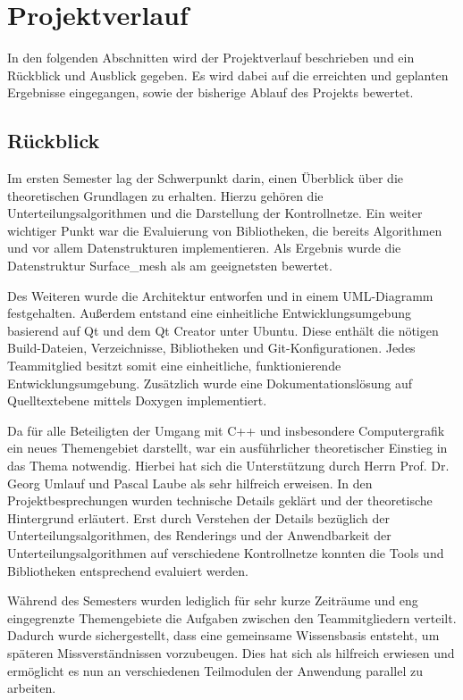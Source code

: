 \chapter{Projektverlauf}

In den folgenden Abschnitten wird der Projektverlauf beschrieben und ein Rückblick und Ausblick gegeben.
Es wird dabei auf die erreichten und geplanten Ergebnisse eingegangen, sowie der bisherige Ablauf des Projekts bewertet.

\section{Rückblick}

Im ersten Semester lag der Schwerpunkt darin, einen Überblick über die theoretischen Grundlagen zu erhalten. 
Hierzu gehören die Unterteilungsalgorithmen und die Darstellung der Kontrollnetze.
Ein weiter wichtiger Punkt war die Evaluierung von Bibliotheken, die bereits Algorithmen und vor allem Datenstrukturen implementieren. 
Als Ergebnis wurde die Datenstruktur Surface\_mesh als am geeignetsten bewertet.

Des Weiteren wurde die Architektur entworfen und in einem UML-Diagramm festgehalten.
Außerdem entstand eine einheitliche Entwicklungsumgebung basierend auf Qt und dem Qt Creator unter Ubuntu.
Diese enthält die nötigen Build-Dateien, Verzeichnisse, Bibliotheken und Git-Konfigurationen.
Jedes Teammitglied besitzt somit eine einheitliche, funktionierende Entwicklungsumgebung.
Zusätzlich wurde eine Dokumentationslösung auf Quelltextebene mittels Doxygen implementiert.

Da für alle Beteiligten der Umgang mit C++ und insbesondere Computergrafik ein neues Themengebiet darstellt, war ein ausführlicher theoretischer Einstieg in das Thema notwendig. 
Hierbei hat sich die Unterstützung durch Herrn Prof. Dr. Georg Umlauf und Pascal Laube als sehr hilfreich erweisen.
In den Projektbesprechungen wurden technische Details geklärt und der theoretische Hintergrund erläutert.
Erst durch Verstehen der Details bezüglich der Unterteilungsalgorithmen, des Renderings und der Anwendbarkeit der Unterteilungsalgorithmen auf verschiedene Kontrollnetze konnten die Tools und Bibliotheken entsprechend evaluiert werden.

Während des Semesters wurden lediglich für sehr kurze Zeiträume und eng eingegrenzte Themengebiete die Aufgaben zwischen den Teammitgliedern verteilt.
Dadurch wurde sichergestellt, dass eine gemeinsame Wissensbasis entsteht, um späteren Missverständnissen vorzubeugen.
Dies hat sich als hilfreich erwiesen und ermöglicht es nun an verschiedenen Teilmodulen der Anwendung parallel zu arbeiten.


